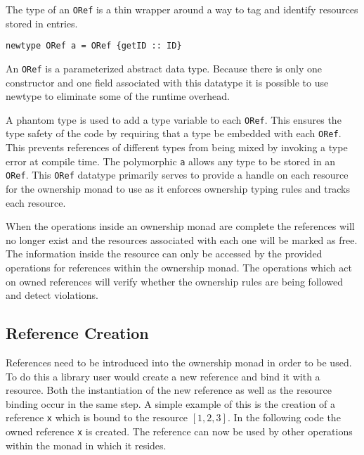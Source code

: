 \documentclass[onehalf,11pt]{beavtex}
\begin{document}
The type of an \texttt{ORef} is a thin wrapper around a way to tag and identify
resources stored in entries.

\begin{verbatim}
newtype ORef a = ORef {getID :: ID}
\end{verbatim}

An \texttt{ORef} is a parameterized abstract data type. Because there is only
one constructor and one field associated with this datatype it is possible to
use newtype to eliminate some of the runtime overhead.

A phantom type is used to add a type variable to each \texttt{ORef}. This
ensures the type safety of the code by requiring that a type be embedded
with each \texttt{ORef}.
This prevents references of different types from being mixed by invoking a
type error at compile time.
The polymorphic \texttt{a} allows any type to be stored in an \texttt{ORef}.
This \texttt{ORef} datatype primarily serves to provide a handle on each
resource for the ownership monad to use as it enforces ownership typing rules
and tracks each resource.

When the operations inside an ownership monad are complete the references
will no longer exist and the resources associated with each one will be marked
as free.
The information inside the resource can only be accessed by the provided
operations for references within the ownership monad.
The operations which act on owned references will verify whether the ownership
rules are being followed and detect violations.


\subsection{Reference Creation}

References need to be introduced into the ownership monad in order to be used.
To do this a library user would create a new reference and bind it with a
resource.
Both the instantiation of the new reference as well as the resource binding
occur in the same step.
A simple example of this is the creation of a reference \texttt{x} which is
bound to the resource $\left[1,2,3\right]$.
In the following code the owned reference \texttt{x} is created.
The reference can now be used by other operations within the monad in which
it resides.
\end{document}
